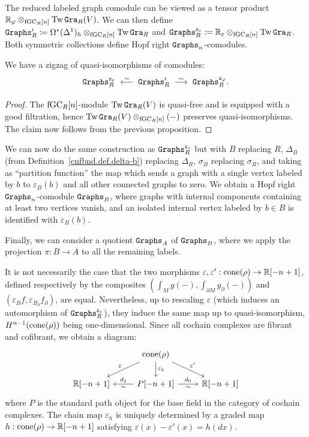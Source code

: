 The reduced labeled graph comodule can be viewed as a tensor product $\mathbb{R}_{\varphi} \otimes_{\mathrm{fGC}_{R}[n]} \operatorname{Tw} \mathtt{Gra}_{R}(V)$.
We can then define $\mathtt{Graphs}'_{R} \coloneqq \Omega^{*}(\Delta^{1})_{h} \otimes_{\mathrm{fGC}_{R}[n]} \operatorname{Tw} \mathtt{Gra}_{R}$ and $\mathtt{Graphs}_{R}^{\mathrm{z}_{\varepsilon}} \coloneqq \mathbb{R}_{\varepsilon} \otimes_{\mathrm{fGC}_{R}[n]} \operatorname{Tw} \mathtt{Gra}_{R}$.
Both symmetric collections define Hopf right $\mathtt{Graphs}_{n}$-comodules.

\begin{proposition}
  \label{cnfbnd.prop.zigzag-homotopy}
  We have a zigzag of quasi-isomorphisms of comodules:
  \[ \Graphs_{R}^{\ze} \qiso* \Graphs'_{R} \qiso \Graphs_{R}^{\zphi}. \]
\end{proposition}
\begin{proof}
  The $\mathrm{fGC}_{R}[n]$-module $\operatorname{Tw} \mathtt{Gra}_{R}(V)$ is quasi-free and is equipped with a good filtration, hence $\operatorname{Tw} \mathtt{Gra}_{R}(V) \otimes_{\mathrm{fGC}_{R}[n]} (-)$ preserves quasi-isomorphisms.
  The claim now follows from the previous proposition.
\end{proof}

We can now do the same construction as $\mathtt{Graphs}^{\mathrm{z}_{\varepsilon}}_{R}$ but with $B$ replacing $R$, $\Delta_{B}$ (from Definition~\ref{cnfbnd.def.delta-b}) replacing $\Delta_{R}$, $\sigma_{B}$ replacing $\sigma_{R}$, and taking as ``partition function'' the map which sends a graph with a single vertex labeled by $b$ to $\varepsilon_{B}(b)$ and all other connected graphs to zero.
We obtain a Hopf right $\mathtt{Graphs}_{n}$-comodule $\mathtt{Graphs}_{B}$, where graphs with internal components containing at least two vertices vanish, and an isolated internal vertex labeled by $b \in B$ is identified with $\varepsilon_{B}(b)$.

Finally, we can consider a quotient $\mathtt{Graphs}_{A}$ of $\mathtt{Graphs}_{B}$, where we apply the projection $\pi : B \to A$ to all the remaining labels.

It is not necessarily the case that the two morphisms $\varepsilon, \varepsilon' : \operatorname{cone}(\rho) \to \mathbb{R}[-n+1]$, defined respectively by the composites $(\int_{M} g(-), \int_{\partial M} g_{\partial}(-))$ and $(\varepsilon_{B}f, \varepsilon_{B_{\partial}}f_{\partial})$, are equal.
Nevertheless, up to rescaling $\varepsilon$ (which induces an automorphism of $\mathtt{Graphs}^{\mathrm{z}_{\varepsilon}}_{R}$), they induce the same map up to quasi-isomorphism, $H^{n-1}(\operatorname{cone}(\rho))$ being one-dimensional.
Since all cochain complexes are fibrant and cofibrant, we obtain a diagram:
\begin{equation}
  \begin{tikzcd}
    {} & \cone(\rho) \dlar[swap]{\varepsilon} \drar{\varepsilon'} \dar{\varepsilon_{h}} \\
    \R[-n+1] & P[-n+1] \lar{\sim}[swap]{d_{1}} \rar{d_{0}}[swap]{\sim} & \R[-n+1]
  \end{tikzcd}
\end{equation}
where $P$ is the standard path object for the base field in the category of cochain complexes.
The chain map $\varepsilon_{h}$ is uniquely determined by a graded map $h : \operatorname{cone}(\rho) \to \mathbb{R}[-n+1]$ satisfying $\varepsilon(x) - \varepsilon'(x) = h(dx)$.


